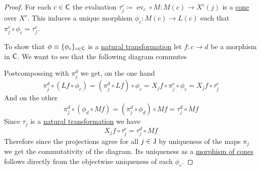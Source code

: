 \documentclass[../../main]{subfiles}
\begin{document}
\begin{proof}
  For each \(c \in \mathsf{C}\) the evaluation \(\tau_{j}^{c} \coloneq \operatorname{ev}_{c} \circ M: M(c) \to X^{c}(j)\) is a \hyperref[def:cone]{cone} over \(X^{c}\).
  This induces a unique morphism \(\phi_{c}: M(c) \to L(c)\) such that \(\pi_{j}^{c} \circ \phi_{c} = \tau_{j}^{c}\).

  To show that \(\phi \equiv \{\phi_{c}\}_{c \in \mathsf{C}}\) is a \hyperref[def:natural-transformation]{natural transformation} let \(f\colon c \to d\) be a morphism in \(\mathsf{C}\).
  We want to see that the following diagram commutes
  \begin{center}
  \end{center}
  Postcompossing with \(\pi_{j}^{d}\) we get, on the one hand
  \begin{equation*}
    \pi_{j}^{d} \circ (Lf \circ \phi_{c}) = (\pi_{j}^{d} \circ Lf) \circ \phi_{c} = X_{j}f \circ \pi_{j}^{c} \circ \phi_{c} = X_{j}f \circ \tau_{j}^{c}
  \end{equation*}
  And on the other
  \begin{equation*}
    \pi_{j}^{d} \circ (\phi_{d} \circ Mf) = (\pi_{j}^{d} \circ \phi_{d}) \circ Mf  = \tau_{j}^{d} \circ Mf
  \end{equation*}
  Since \(\tau_{j}\) is a \hyperref[def:natural-transformation]{natural transformation} we have
  \begin{equation*}
    X_{j}f \circ \tau_{j}^{c} = \tau_{j}^{d} \circ Mf
  \end{equation*}
  Therefore since the projections agree for all \(j \in \mathsf{J}\) by uniqueness of the maps \(\pi_{j}\) we get the commutativity of the diagram.
  Its uniqueness as a \hyperref[def:cone]{morphism of cones} follows directly from the objectwise uniqueness of each \(\phi_{c}\).
\end{proof}
\end{document}
